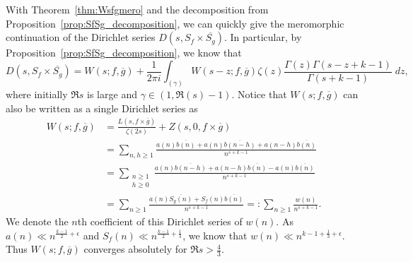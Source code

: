 With Theorem~\ref{thm:Wsfgmero} and the decomposition from
Proposition~\ref{prop:SfSg_decomposition}, we can quickly give the meromorphic
continuation of the Dirichlet series $D(s, S_f \times \overline{S_g})$.
In particular, by Proposition~\ref{prop:SfSg_decomposition}, we know that
\begin{equation}
  D(s, S_f \times \overline{S_g}) = W(s; f, \overline{g}) + \frac{1}{2\pi i}
  \int_{(\gamma)} W(s-z; f, \overline{g}) \zeta(z)\frac{\Gamma(z) \Gamma(s - z + k -
  1)}{\Gamma(s + k - 1)} \; dz,
\end{equation}
where initially $\Re s$ is large and $\gamma \in (1, \Re(s) - 1)$.
Notice that $W(s; f, \overline{g})$ can also be written as a single Dirichlet series as
\begin{align}
  W(s; f, \overline{g}) &= \frac{L(s, f\times \overline{g})}{\zeta(2s)} + Z(s, 0, f\times
  \overline{g}) \\
  &= \sum_{n,h \geq 1} \frac{a(n) \overline{b(n)} + a(n)\overline{b(n-h)} +
  a(n-h)\overline{b(n)}}{n^{s + k - 1}} \\
  &= \sum_{\substack{n \geq 1 \\ h \geq 0}} \frac{a(n)\overline{b(n-h)} +
  a(n-h)\overline{b(n)} - a(n)\overline{b(n)}}{n^{s + k - 1}} \\
  &= \sum_{n \geq 1} \frac{a(n) \overline{S_g(n)} + S_f(n) \overline{b(n)}}{n^{s + k - 1}}
  =: \sum_{n \geq 1} \frac{w(n)}{n^{s + k - 1}}.
\end{align}
We denote the $n$th coefficient of this Dirichlet series of $w(n)$.
As $a(n) \ll n^{\frac{k-1}{2} + \epsilon}$ and $S_f(n) \ll n^{\frac{k-1}{2} +
\frac{1}{3}}$, we know that $w(n) \ll n^{k-1 + \frac{1}{3} + \epsilon}$.
Thus $W(s; f, \overline{g})$ converges absolutely for $\Re s > \frac{4}{3}$.

